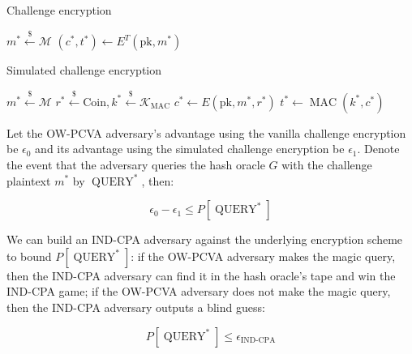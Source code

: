\documentclass{article}
\newcommand{\leftsample}{\overset{{\scriptscriptstyle\$}}{\leftarrow}}
\begin{document}
\begin{multicols}{2}
    \begin{algorithm}[H]
        \SetAlgoLined
        \caption{Challenge encryption}
        $m^\ast \leftsample \mathcal{M}$\;
        $(c^\ast, t^\ast) \leftarrow E^T(\text{pk}, m^\ast)$\;
    \end{algorithm}

    \begin{algorithm}[H]
        \SetAlgoLined
        \caption{Simulated challenge encryption}
        $m^\ast \leftsample \mathcal{M}$\;
        $r^\ast \leftsample \text{Coin}, k^\ast \leftsample \mathcal{K}_\text{MAC}$\;
        $c^\ast \leftarrow E(\text{pk}, m^\ast, r^\ast)$\;
        $t^\ast \leftarrow \operatorname{MAC}(k^\ast, c^\ast)$
    \end{algorithm}
\end{multicols}

Let the OW-PCVA adversary's advantage using the vanilla challenge encryption be $\epsilon_0$ and its advantage using the simulated challenge encryption be $\epsilon_1$. Denote the event that the adversary queries the hash oracle $G$ with the challenge plaintext $m^\ast$ by $\operatorname{QUERY}^\ast$, then:

\begin{equation*}
    \epsilon_0 - \epsilon_1 \leq P[\operatorname{QUERY}^\ast]
\end{equation*}

We can build an IND-CPA adversary against the underlying encryption scheme to bound $P[\operatorname{QUERY}^\ast]$: if the OW-PCVA adversary makes the magic query, then the IND-CPA adversary can find it in the hash oracle's tape and win the IND-CPA game; if the OW-PCVA adversary does not make the magic query, then the IND-CPA adversary outputs a blind guess:

\begin{equation*}
    P[\operatorname{QUERY}^\ast] \leq \epsilon_\text{IND-CPA}
\end{equation*}
\end{document}
